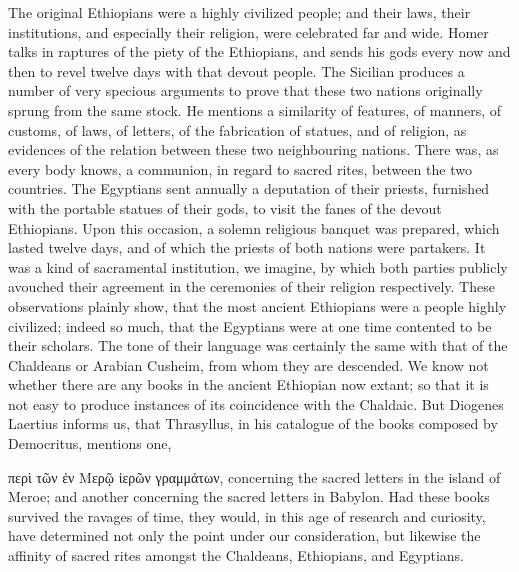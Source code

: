 \documentclass{article}
\begin{document}
The original Ethiopians were a highly civilized people; and their laws, their institutions, and especially their religion, were celebrated far and wide. Homer talks in raptures of the piety of the Ethiopians, and sends his gods every now and then to revel twelve days with that devout people. The Sicilian produces a number of very specious arguments to prove that these two nations originally sprung from the same stock. He mentions a similarity of features, of manners, of customs, of laws, of letters, of the fabrication of statues, and of religion, as evidences of the relation between these two neighbouring nations. There was, as every body knows, a communion, in regard to sacred rites, between the two countries. The Egyptians sent annually a deputation of their priests, furnished with the portable statues of their gods, to visit the fanes of the devout Ethiopians. Upon this occasion, a solemn religious banquet was prepared, which lasted twelve days, and of which the priests of both nations were partakers. It was a kind of sacramental institution, we imagine, by which both parties publicly avouched their agreement in the ceremonies of their religion respectively. These observations plainly show, that the most ancient Ethiopians were a people highly civilized; indeed so much, that the Egyptians were at one time contented to be their scholars. The tone of their language was certainly the same with that of the Chaldeans or Arabian Cusheim, from whom they are descended. We know not whether there are any books in the ancient Ethiopian now extant; so that it is not easy to produce instances of its coincidence with the Chaldaic. But Diogenes Laertius informs us, that Thrasyllus, in his catalogue of the books composed by Democritus, mentions one,

περὶ τῶν ἐν Μερῷ ἱερῶν γραμμάτων, concerning the sacred letters in the island of Meroe; and another concerning the sacred letters in Babylon. Had these books survived the ravages of time, they would, in this age of research and curiosity, have determined not only the point under our consideration, but likewise the affinity of sacred rites amongst the Chaldeans, Ethiopians, and Egyptians.
\end{document}
